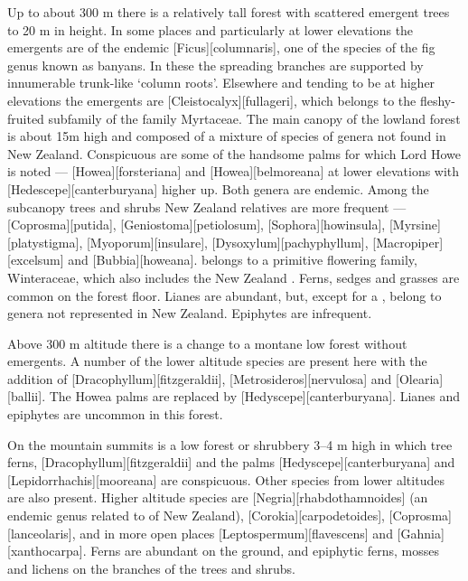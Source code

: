 Up to about 300 m there is a relatively tall forest with scattered emergent trees to 20 m in height.
In some places and particularly at lower elevations the emergents are of the endemic [Ficus][columnaris], one of the species of the fig genus known as banyans.
In these the spreading branches are supported by innumerable trunk-like `column roots'.
Elsewhere and tending to be at higher elevations the emergents are [Cleistocalyx][fullageri], which belongs to the fleshy-fruited subfamily of the family Myrtaceae.
The main canopy of the lowland forest is about 15m high and composed of a mixture of species of genera not found in New Zealand.
Conspicuous are some of the handsome palms for which Lord Howe is noted --- [Howea][forsteriana] and [Howea][belmoreana] at lower elevations with [Hedescepe][canterburyana] higher up.
Both genera are endemic.
Among the subcanopy trees and shrubs New Zealand relatives are more frequent --- [Coprosma][putida], [Geniostoma][petiolosum], [Sophora][howinsula], [Myrsine][platystigma], [Myoporum][insulare], [Dysoxylum][pachyphyllum], [Macropiper][excelsum] and [Bubbia][howeana].  belongs to a primitive flowering family, Winteraceae, which also includes the New Zealand .
Ferns, sedges and grasses are common on the forest floor.
Lianes are abundant, but, except for a , belong to genera not represented in New Zealand.
Epiphytes are infrequent.

Above 300 m altitude there is a change to a montane low forest without emergents.
A number of the lower altitude species are present here with the addition of [Dracophyllum][fitzgeraldii], [Metrosideros][nervulosa] and [Olearia][ballii].
The Howea palms are replaced by [Hedyscepe][canterburyana].
Lianes and epiphytes are uncommon in this forest.

On the mountain summits is a low forest or shrubbery 3–4 m high in which tree ferns, [Dracophyllum][fitzgeraldii] and the palms [Hedyscepe][canterburyana] and [Lepidorrhachis][mooreana] are conspicuous.
Other species from lower altitudes are also present.
Higher altitude species are [Negria][rhabdothamnoides] (an endemic genus related to  of New Zealand), [Corokia][carpodetoides], [Coprosma][lanceolaris], and in more open places [Leptospermum][flavescens] and [Gahnia][xanthocarpa].
Ferns are abundant on the ground, and epiphytic ferns, mosses and lichens on the branches of the trees and shrubs.

